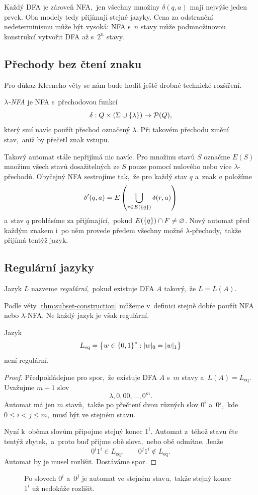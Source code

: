Každý DFA je zároveň NFA,~jen všechny množiny $\delta(q,a)$ mají nejvýše jeden prvek. Oba modely tedy přijímají stejné jazyky. Cena za odstranění nedeterminismu může být vysoká: NFA s~$n$ stavy může podmnožinovou konstrukcí vytvořit DFA až s~$2^n$ stavy.

\subsection{Přechody bez čtení znaku}

Pro důkaz Kleeneho věty se nám bude hodit ještě drobné technické rozšíření.

\begin{definition}
    \emph{$\lambda$-NFA} je NFA s~přechodovou funkcí
    \[
        \delta:Q\times(\Sigma\cup\left\{\lambda\right\}) \rightarrow \mathcal{P}(Q),
    \]
    který smí navíc použít přechod označený $\lambda$. Při takovém přechodu změní stav,~aniž by přečetl znak vstupu.
\end{definition}

Takový automat stále nepřijímá nic navíc. Pro množinu stavů $S$ označme $E(S)$ množinu všech stavů dosažitelných ze $S$ pouze pomocí nulového nebo více $\lambda$-přechodů. Obyčejný NFA sestrojíme tak,~že pro každý stav $q$ a~znak $a$ položíme
\[\delta'(q,a)=E\left(\bigcup_{r\in E(\left\{q\right\})}\delta(r,a)\right)\]
a~stav $q$ prohlásíme za přijímající,~pokud $E(\left\{q\right\})\cap F\neq\varnothing$. Nový automat před každým znakem i~po něm provede předem všechny možné $\lambda$-přechody,~takže přijímá tentýž jazyk.

\subsection{Regulární jazyky}

\begin{definition}
    Jazyk $L$ nazveme \emph{regulární},~pokud existuje DFA $A$ takový,~že $L=L(A)$.
\end{definition}

Podle věty \ref{thm:subset-construction} můžeme v~definici stejně dobře použít NFA nebo $\lambda$-NFA. Ne každý jazyk je však regulární.

\begin{theorem}\label{thm:leq-neregular}
    Jazyk
    \[L_{\mathrm{eq}}=\left\{w\in\left\{0,1\right\}^*:|w|_0=|w|_1\right\}\]
    není regulární.
\end{theorem}
\begin{proof}
    Předpokládejme pro spor,~že existuje DFA $A$ s~$m$ stavy a~$L(A)=L_{\mathrm{eq}}$. Uvažujme $m+1$ slov
    \[\lambda,0,00,\dots,0^m.\]
    Automat má jen $m$ stavů,~takže po přečtení dvou různých slov $0^i$ a~$0^j$,~kde $0\leqslant i<j\leqslant m$,~musí být ve stejném stavu.

    Nyní k~oběma slovům připojme stejný konec $1^i$. Automat z~téhož stavu čte tentýž zbytek,~a~proto buď přijme obě slova,~nebo obě odmítne. Jenže
    \[0^i1^i\in L_{\mathrm{eq}},\qquad 0^j1^i\notin L_{\mathrm{eq}}.\]
    Automat by je musel rozlišit. Dostáváme spor.
\end{proof}

\begin{figure}[h]
    \centering
    
    \caption{Po slovech $0^i$ a~$0^j$ je automat ve stejném stavu,~takže stejný konec $1^i$ už nedokáže rozlišit.}
\end{figure}
